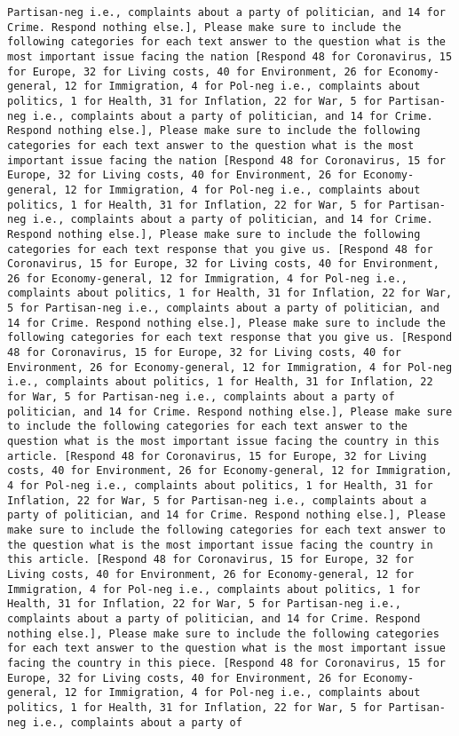 \begin{lstlisting}[label=lst:poor_performing_prompts]
Partisan-neg i.e., complaints about a party of politician, and 14 for Crime. Respond nothing else.], Please make sure to include the following categories for each text answer to the question what is the most important issue facing the nation [Respond 48 for Coronavirus, 15 for Europe, 32 for Living costs, 40 for Environment, 26 for Economy-general, 12 for Immigration, 4 for Pol-neg i.e., complaints about politics, 1 for Health, 31 for Inflation, 22 for War, 5 for Partisan-neg i.e., complaints about a party of politician, and 14 for Crime. Respond nothing else.], Please make sure to include the following categories for each text answer to the question what is the most important issue facing the nation [Respond 48 for Coronavirus, 15 for Europe, 32 for Living costs, 40 for Environment, 26 for Economy-general, 12 for Immigration, 4 for Pol-neg i.e., complaints about politics, 1 for Health, 31 for Inflation, 22 for War, 5 for Partisan-neg i.e., complaints about a party of politician, and 14 for Crime. Respond nothing else.], Please make sure to include the following categories for each text response that you give us. [Respond 48 for Coronavirus, 15 for Europe, 32 for Living costs, 40 for Environment, 26 for Economy-general, 12 for Immigration, 4 for Pol-neg i.e., complaints about politics, 1 for Health, 31 for Inflation, 22 for War, 5 for Partisan-neg i.e., complaints about a party of politician, and 14 for Crime. Respond nothing else.], Please make sure to include the following categories for each text response that you give us. [Respond 48 for Coronavirus, 15 for Europe, 32 for Living costs, 40 for Environment, 26 for Economy-general, 12 for Immigration, 4 for Pol-neg i.e., complaints about politics, 1 for Health, 31 for Inflation, 22 for War, 5 for Partisan-neg i.e., complaints about a party of politician, and 14 for Crime. Respond nothing else.], Please make sure to include the following categories for each text answer to the question what is the most important issue facing the country in this article. [Respond 48 for Coronavirus, 15 for Europe, 32 for Living costs, 40 for Environment, 26 for Economy-general, 12 for Immigration, 4 for Pol-neg i.e., complaints about politics, 1 for Health, 31 for Inflation, 22 for War, 5 for Partisan-neg i.e., complaints about a party of politician, and 14 for Crime. Respond nothing else.], Please make sure to include the following categories for each text answer to the question what is the most important issue facing the country in this article. [Respond 48 for Coronavirus, 15 for Europe, 32 for Living costs, 40 for Environment, 26 for Economy-general, 12 for Immigration, 4 for Pol-neg i.e., complaints about politics, 1 for Health, 31 for Inflation, 22 for War, 5 for Partisan-neg i.e., complaints about a party of politician, and 14 for Crime. Respond nothing else.], Please make sure to include the following categories for each text answer to the question what is the most important issue facing the country in this piece. [Respond 48 for Coronavirus, 15 for Europe, 32 for Living costs, 40 for Environment, 26 for Economy-general, 12 for Immigration, 4 for Pol-neg i.e., complaints about politics, 1 for Health, 31 for Inflation, 22 for War, 5 for Partisan-neg i.e., complaints about a party of 
\end{lstlisting}
